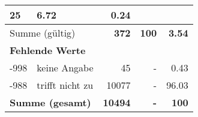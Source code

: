 \begin{longtable}{lXrrr}
       \num{25} &
       \num[round-mode=places,round-precision=2]{6.72} &
         \num[round-mode=places,round-precision=2]{0.24} \\
     \midrule
     \multicolumn{2}{l}{Summe (gültig)} &
       \textbf{\num{372}} &
     \textbf{\num{100}} &
       \textbf{\num[round-mode=places,round-precision=2]{3.54}} \\
     \multicolumn{5}{l}{\textbf{Fehlende Werte}}\\
       -998 &
       keine Angabe &
         \num{45} &
        - &
         \num[round-mode=places,round-precision=2]{0.43} \\
       -988 &
       trifft nicht zu &
         \num{10077} &
        - &
         \num[round-mode=places,round-precision=2]{96.03} \\
     \midrule
     \multicolumn{2}{l}{\textbf{Summe (gesamt)}} &
          \textbf{\num{10494}} &
        \textbf{-} &
        \textbf{\num{100}} \\
     \bottomrule
     \end{longtable}
     

